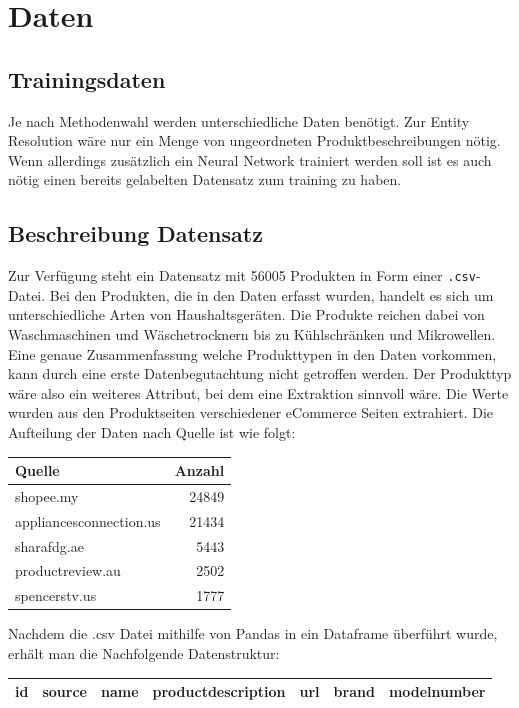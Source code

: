 \documentclass[paper=a4,12pt,listof=totoc]{scrartcl}%
\begin{document}
	\section{Daten}
	\subsection{Trainingsdaten}
	Je nach Methodenwahl werden unterschiedliche Daten benötigt. Zur Entity Resolution wäre nur ein Menge von ungeordneten Produktbeschreibungen nötig. Wenn allerdings zusätzlich ein Neural Network trainiert werden soll ist es auch nötig einen bereits gelabelten Datensatz zum training zu haben.
	\subsection{Beschreibung Datensatz}
	Zur Verfügung steht ein Datensatz mit 56005 Produkten in Form einer \texttt{.csv}-Datei. Bei den Produkten, die in den Daten erfasst wurden, handelt es sich um unterschiedliche Arten von Haushaltsgeräten. Die Produkte reichen dabei von Waschmaschinen und Wäschetrocknern bis zu Kühlschränken und Mikrowellen. Eine genaue Zusammenfassung welche Produkttypen in den Daten vorkommen, kann durch eine erste Datenbegutachtung nicht getroffen werden. Der Produkttyp wäre also ein weiteres Attribut, bei dem eine Extraktion sinnvoll wäre. Die Werte wurden aus den Produktseiten verschiedener eCommerce Seiten extrahiert. Die Aufteilung der Daten nach Quelle ist wie folgt:\\
	
	\begin{tabular}[h]{|l|r|}
		\hline 
		Quelle & Anzahl \\ \hline 
		shopee.my&24849\\
		appliancesconnection.us&21434\\
		sharafdg.ae&5443\\
		productreview.au&2502\\
		spencerstv.us&1777\\ \hline
	\end{tabular}
	
	Nachdem die .csv Datei mithilfe von Pandas in ein Dataframe überführt wurde, erhält man die Nachfolgende Datenstruktur:\\
	
	\begin{tabular}[h]{|c|c|c|c|c|c|c|}
		\hline 
		id & source & name & productdescription & url & brand & modelnumber \\ \hline 
	\end{tabular}
\end{document}
